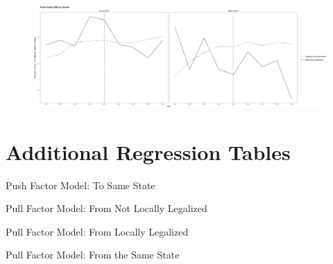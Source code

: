 \documentclass[12pt,letterpaper]{article}
\begin{document}
\begin{figure}[h]
    \centering
    \includegraphics[width=0.75\linewidth]{outputs/summary_stats/inc_ante_diffs.png}
    \caption{}
    \label{fig: fig:enter-label}
\end{figure}

\FloatBarrier
\newpage
\section{Additional Regression Tables}
\begin{table}[h] %
    \centering
    \caption{Push Factor Model: To Same State}
    \label{tab: tstay_exante_model}
    
\end{table}
\begin{table}[h]
    \centering
    \caption{Pull Factor Model: From Not Locally Legalized}
    \label{tab: ffed_expost_model}
    
\end{table}
\begin{table}[h] %
    \centering
    \caption{Pull Factor Model: From Locally Legalized}
    \label{tab: flocal_expost_model}
    
\end{table}
\begin{table}[h]
    \centering
    \caption{Pull Factor Model: From the Same State}
    \label{tab: fstay_expost_model}
    
\end{table}
\end{document}
